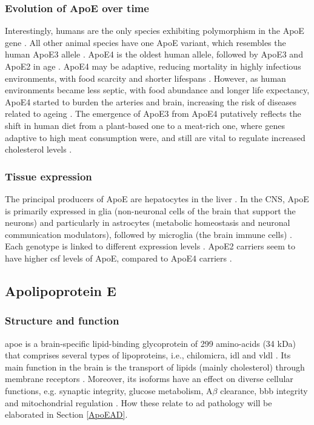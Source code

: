 \documentclass{amsart}
\begin{document}
\subsubsection{Evolution of ApoE over time}
Interestingly, humans are the only species exhibiting polymorphism in the ApoE gene \cite{Yassine2020APOEDisease}. All other animal species have one ApoE variant, which resembles the human ApoE3 allele \cite{Hunsberger2019TheInterventions}. ApoE4 is the oldest human allele, followed by ApoE3 and ApoE2 in age \cite{Yassine2020APOEDisease}. ApoE4 may be adaptive, reducing mortality in highly infectious environments, with food scarcity and shorter lifespans \cite{Trumble2017ApolipoproteinBurden}. However, as human environments became less septic, with food abundance and longer life expectancy, ApoE4 started to burden the arteries and brain, increasing the risk of diseases related to ageing \cite{Yassine2020APOEDisease}. The emergence of ApoE3 from ApoE4 putatively reflects the shift in human diet from a plant-based one to a meat-rich one, where genes adaptive to high meat consumption were, and still are vital to regulate increased cholesterol levels \cite{Finch1999TheIsoforms}. 

\subsubsection{Tissue expression}
The principal producers of ApoE are hepatocytes in the liver \cite{Mahley2016CentralMetabolism}. In the CNS, ApoE is primarily expressed in glia (non-neuronal cells of the brain that support the neurons) and particularly in astrocytes (metabolic homeostasis and neuronal communication modulators), followed by microglia (the brain immune cells) \cite{Lanfranco2021ExpressionInflammation}. Each genotype is linked to different expression levels \cite{Husain2021APOETherapeutics}. ApoE2 carriers seem to have higher \acrfull{csf} levels of ApoE, compared to ApoE4 carriers \cite{Castellano2011HumanClearance, Cruchaga2012CerebrospinalDisease}. 

\subsection{Apolipoprotein E}\label{ApoEprot}
\subsubsection{Structure and function}
\acrshort{apoe} is a brain-specific lipid-binding glycoprotein of 299 amino-acids (34 kDa) that comprises several types of lipoproteins, i.e., chilomicra, \acrlong{idl} and \acrlong{vldl} \cite{Husain2021APOETherapeutics}. Its main function in the brain is the transport of lipids (mainly cholesterol) through membrane receptors \cite{Yang2023ApolipoproteinDisease}. Moreover, its isoforms have an effect on diverse cellular functions, e.g. synaptic integrity, glucose metabolism, A$\beta$ clearance, \acrlong{bbb} integrity and mitochondrial regulation \cite{Husain2021APOETherapeutics}. How these relate to \acrshort{ad} pathology will be elaborated in Section \ref{ApoEAD}.
\end{document}
